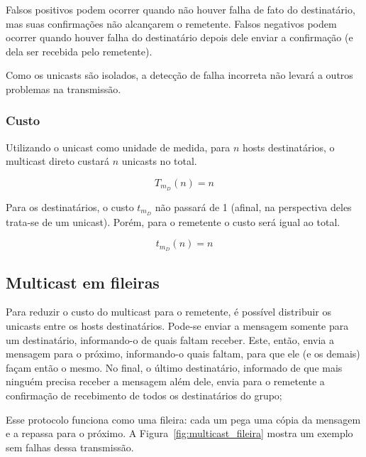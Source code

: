 \documentclass[12pt,twocolumn]{article}
\begin{document}
					Falsos positivos podem ocorrer quando não houver falha de fato do destinatário, mas suas confirmações não alcançarem o remetente.
					Falsos negativos podem ocorrer quando houver falha do destinatário depois dele enviar a confirmação (e dela ser recebida pelo remetente).
					
					Como os unicasts são isolados, a detecção de falha incorreta não levará a outros problemas na transmissão.
					
				\subsubsection{Custo}	
					Utilizando o unicast como unidade de medida, para $n$ hosts destinatários, o multicast direto custará $n$ unicasts no total.
					
					\begin{equation} \label{eq:multicast_direct}
						T_{m_D} (n) = n
					\end{equation}	
				
					Para os destinatários, o custo $t_{m_D}$ não passará de 1 (afinal, na perspectiva deles trata-se de um unicast).
					Porém, para o remetente o custo será igual ao total. 
					
					\begin{equation} \label{eq:multicast_direct_local}
						t_{m_D} (n) = n
					\end{equation}
			
			\subsection{Multicast em fileiras}
			
				Para reduzir o custo do multicast para o remetente, é possível distribuir os unicasts entre os hosts destinatários.
				Pode-se enviar a mensagem somente para um destinatário, informando-o de quais faltam receber.
				Este, então, envia a mensagem para o próximo, informando-o quais faltam, para que ele (e os demais) façam então o mesmo.
				No final, o último destinatário, informado de que mais ninguém precisa receber a mensagem além dele, envia para o remetente a confirmação de recebimento de todos os destinatários do grupo;
				
				Esse protocolo funciona como uma fileira: cada um pega uma cópia da mensagem e a repassa para o próximo. 
				A Figura~\ref{fig:multicast_fileira} mostra um exemplo sem falhas dessa transmissão.
				
\end{document}
